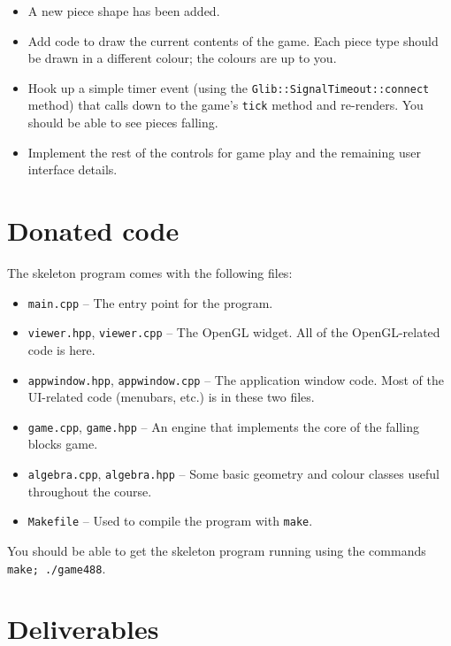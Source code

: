 \begin{itemize}
	\item A new piece shape has been added.

	\item Add code to draw the current contents of the game.
		  Each piece type should be drawn in a different colour;
		  the colours are up to you.

	\item Hook up a simple timer event (using the \texttt{Glib::SignalTimeout::connect}
		  method) that calls down to the game's
		  \texttt{tick} method and re-renders.  You should be able to see
		  pieces falling.

	\item Implement the rest of the controls for game play and
		  the remaining user interface details.
\end{itemize}

\section{Donated code}

The skeleton program comes with the following files:

\begin{itemize}
        \item \texttt{main.cpp} -- The entry point for the program.
        \item \texttt{viewer.hpp}, \texttt{viewer.cpp} -- The OpenGL
          widget. All of the OpenGL-related code is here.
        \item \texttt{appwindow.hpp}, \texttt{appwindow.cpp} -- The
          application window code. Most of the UI-related code
          (menubars, etc.) is in these two files.
	\item \texttt{game.cpp}, \texttt{game.hpp} -- An engine that implements
		the core of the falling blocks game.
	\item \texttt{algebra.cpp}, \texttt{algebra.hpp} -- Some basic geometry
		and colour classes useful throughout the course.
	\item \texttt{Makefile} -- Used to compile the program with \texttt{make}.
\end{itemize}

You should be able to get the skeleton program running using the
commands \texttt{make; ./game488}.

\section{Deliverables}

